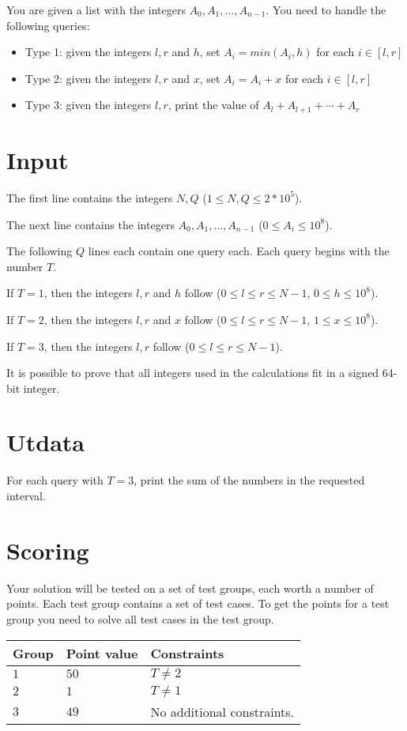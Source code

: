 
You are given a list with the integers $A_0, A_1, \dots, A_{n-1}$. You need to handle the following queries:


\begin{itemize}
    \item Type 1: given the integers $l, r$ and $h$, set $A_i=min(A_i, h)$ for each $i \in [l,r]$
    \item Type 2: given the integers $l, r$ and $x$, set $A_i=A_i+x$ for each $i \in [l,r]$
    \item Type 3: given the integers $l, r$, print the value of $A_l+A_{l+1}+\cdots+A_{r}$
\end{itemize}


\section*{Input}
The first line contains the integers $N, Q$ ($1 \leq N, Q \leq 2*10^5$).

The next line contains the integers $A_0, A_1, \dots, A_{n-1}$ ($0 \leq A_i \leq 10^8$).

The following $Q$ lines each contain one query each. Each query begins with the number $T$.

If $T=1$, then the integers $l, r$ and $h$ follow ($0 \leq l \leq r \leq N - 1$, $0 \leq h \leq 10^8$).

If $T=2$, then the integers $l, r$ and $x$ follow ($0 \leq l \leq r \leq N - 1$, $1 \leq x \leq 10^8$).

If $T=3$, then the integers $l, r$ follow ($0 \leq l \leq r \leq N - 1$).

It is possible to prove that all integers used in the calculations fit in a signed 64-bit integer.

\section*{Utdata}
For each query with $T=3$, print the sum of the numbers in the requested interval.

\section*{Scoring}
Your solution will be tested on a set of test groups, each worth a number of points.
Each test group contains a set of test cases.
To get the points for a test group you need to solve all test cases in the test group.

\noindent
\begin{tabular}{| l | l | p{12cm} |}
  \hline
  \textbf{Group} & \textbf{Point value} & \textbf{Constraints} \\ \hline
  $1$    & $50$         & $T \neq 2$  \\ \hline
  $2$    & $1$          & $T \neq 1$ \\ \hline
  $3$    & $49$         & No additional constraints. \\ \hline
\end{tabular}
